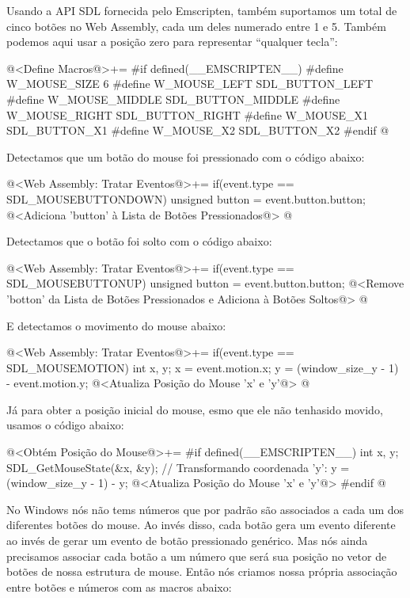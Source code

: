 
Usando a API SDL fornecida pelo Emscripten, também suportamos um total
de cinco botões no Web Assembly, cada um deles numerado entre 1 e
5. Também podemos aqui usar a posição zero para representar ``qualquer
tecla'':

\iniciocodigo
@<Define Macros@>+=
#if defined(__EMSCRIPTEN__)
#define W_MOUSE_SIZE 6
#define W_MOUSE_LEFT   SDL_BUTTON_LEFT
#define W_MOUSE_MIDDLE SDL_BUTTON_MIDDLE
#define W_MOUSE_RIGHT  SDL_BUTTON_RIGHT
#define W_MOUSE_X1     SDL_BUTTON_X1
#define W_MOUSE_X2     SDL_BUTTON_X2
#endif
@
\fimcodigo

Detectamos que um botão do mouse foi pressionado com o código abaixo:

\iniciocodigo
@<Web Assembly: Tratar Eventos@>+=
if(event.type == SDL_MOUSEBUTTONDOWN){
  unsigned button = event.button.button;
  @<Adiciona 'button' à Lista de Botões Pressionados@>
}
@
\fimcodigo

Detectamos que o botão foi solto com o código abaixo:

\iniciocodigo
@<Web Assembly: Tratar Eventos@>+=
if(event.type == SDL_MOUSEBUTTONUP){
  unsigned button = event.button.button;
  @<Remove 'botton' da Lista de Botões Pressionados e Adiciona à Botões Soltos@>
}
@
\fimcodigo

E detectamos o movimento do mouse abaixo:

\iniciocodigo
@<Web Assembly: Tratar Eventos@>+=
if(event.type == SDL_MOUSEMOTION){
  int x, y;
  x = event.motion.x;
  y = (window_size_y - 1) - event.motion.y;
  @<Atualiza Posição do Mouse 'x' e 'y'@>
}
@
\fimcodigo

Já para obter a posição inicial do mouse, esmo que ele não tenhasido
movido, usamos o código abaixo:

\iniciocodigo
@<Obtém Posição do Mouse@>+=
#if defined(__EMSCRIPTEN__)
{
  int x, y;
  SDL_GetMouseState(&x, &y);
  // Transformando coordenada 'y':
  y = (window_size_y - 1) - y;
  @<Atualiza Posição do Mouse 'x' e 'y'@>
}
#endif
@
\fimcodigo


No Windows nós não tems números que por padrão são associados a cada
um dos diferentes botões do mouse. Ao invés disso, cada botão gera um
evento diferente ao invés de gerar um evento de botão pressionado
genérico. Mas nós ainda precisamos associar cada botão a um número que
será sua posição no vetor de botões de nossa estrutura de mouse. Então
nós criamos nossa própria associação entre botões e números com as
macros abaixo:

